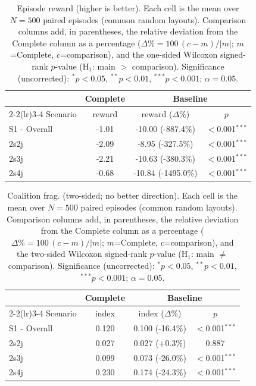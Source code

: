\begin{table}[ht]
  \centering
  \caption{Episode reward (higher is better). Each cell is the mean over $N=500$ paired episodes (common random layouts). Comparison columns add, in parentheses, the relative deviation from the Complete column as a percentage ($\Delta\%=100\,(c-m)/|m|$; $m$=Complete, $c$=comparison), and the one-sided Wilcoxon signed-rank $p$-value (H$_1$: main $>$ comparison). Significance (uncorrected): $^{*}p<0.05$, $^{**}p<0.01$, $^{***}p<0.001$; $\alpha=0.05$.}
  \label{tab:wilcoxon-reward}
  \small
  \begin{tabular}{l c cc}
    \toprule
     & Complete & \multicolumn{2}{c}{Baseline} \\
    \cmidrule(lr){2-2}\cmidrule(lr){3-4}
    Scenario & {reward} & {reward ($\Delta$\%)} & {$p$} \\
    \midrule
    S1 - Overall & -1.01 & -10.00 (-887.4\%) & $<$0.001$^{***}$ \\
    2s2j & -2.09 & -8.95 (-327.5\%) & $<$0.001$^{***}$ \\
    2s3j & -2.21 & -10.63 (-380.3\%) & $<$0.001$^{***}$ \\
    2s4j & -0.68 & -10.84 (-1495.0\%) & $<$0.001$^{***}$ \\
    \bottomrule
  \end{tabular}
\end{table}

\begin{table}[ht]
  \centering
  \caption{Coalition frag. (two-sided; no better direction). Each cell is the mean over $N=500$ paired episodes (common random layouts). Comparison columns add, in parentheses, the relative deviation from the Complete column as a percentage ($\Delta\%=100\,(c-m)/|m|$; $m$=Complete, $c$=comparison), and the two-sided Wilcoxon signed-rank $p$-value (H$_1$: main $\neq$ comparison). Significance (uncorrected): $^{*}p<0.05$, $^{**}p<0.01$, $^{***}p<0.001$; $\alpha=0.05$.}
  \label{tab:wilcoxon-fragmentation}
  \small
  \begin{tabular}{l c cc}
    \toprule
     & Complete & \multicolumn{2}{c}{Baseline} \\
    \cmidrule(lr){2-2}\cmidrule(lr){3-4}
    Scenario & {index} & {index ($\Delta$\%)} & {$p$} \\
    \midrule
    S1 - Overall & 0.120 & 0.100 (-16.4\%) & $<$0.001$^{***}$ \\
    2s2j & 0.027 & 0.027 (+0.3\%) & 0.887 \\
    2s3j & 0.099 & 0.073 (-26.0\%) & $<$0.001$^{***}$ \\
    2s4j & 0.230 & 0.174 (-24.3\%) & $<$0.001$^{***}$ \\
    \bottomrule
  \end{tabular}
\end{table}
